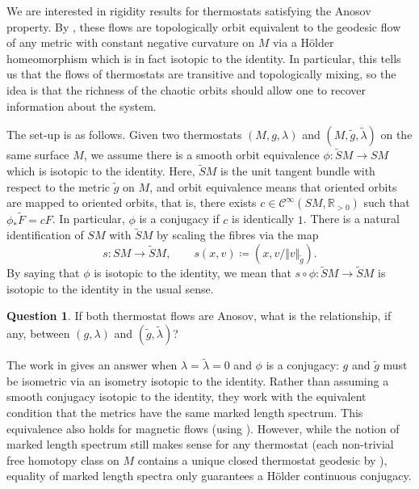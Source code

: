 \documentclass[reqno,12pt,letterpaper]{amsart}
\theoremstyle{definition}
\theoremstyle{remark}
\theoremstyle{definition}
\newtheorem{question}[proposition]{Question}
\numberwithin{equation}{section}
\newcommand{\R}{\mathbb{R}}
\begin{document}
We are interested in rigidity results for thermostats satisfying the Anosov property. By \cite[Theorem A]{ghys84}, these flows are topologically orbit equivalent to the geodesic flow of any metric with constant negative curvature on $M$ via a Hölder homeomorphism which is in fact isotopic to the identity. In particular, this tells us that the flows of thermostats are transitive and topologically mixing, so the idea is that the richness of the chaotic orbits should allow one to recover information about the system. 

The set-up is as follows. Given two thermostats $(M, g, \lambda)$ and $(M, \tilde{g}, \tilde{\lambda})$ on the same surface $M$, we assume there is a smooth orbit equivalence $\phi : \widetilde{S}M\to SM$ which is isotopic to the identity. Here, $\widetilde{S}M$ is the unit tangent bundle with respect to the metric $\tilde{g}$ on $M$, and orbit equivalence means that oriented orbits are mapped to oriented orbits, that is, there exists $c\in \mathcal{C}^\infty(SM, \R_{>0})$ such that $\phi_* \widetilde{F}=cF$. In particular, $\phi$ is a conjugacy if $c$ is identically $1$. There is a natural identification of $SM$ with $\widetilde{S}M$ by scaling the fibres via the map 
\begin{equation}\label{eq:scaling-map}
s: SM\to \widetilde{S}M, \qquad s(x,v)\coloneqq (x, v/\Vert v\Vert_{\tilde{g}}).
\end{equation}
By saying that $\phi$ is isotopic to the identity, we mean that $s\circ \phi :\widetilde{S}M\to \widetilde{S}M$ is isotopic to the identity in the usual sense. 

\begin{question}
If both thermostat flows are Anosov, what is the relationship, if any, between $(g, \lambda)$ and $(\tilde{g}, \tilde{\lambda})$? 
\end{question}

The work in \cite{guillarmou25} gives an answer when $\lambda=\tilde{\lambda}=0$ and $\phi$ is a conjugacy: $g$ and $\tilde{g}$ must be isometric via an isometry isotopic to the identity. Rather than assuming a smooth conjugacy isotopic to the identity, they work with the equivalent condition that the metrics have the same marked length spectrum. This equivalence also holds for magnetic flows (using \cite[Theorem 1.1]{gogolev23}). However, while the notion of marked length spectrum still makes sense for any thermostat (each non-trivial free homotopy class on $M$ contains a unique closed thermostat geodesic by \cite[Theorem A]{ghys84}), equality of marked length spectra only guarantees a Hölder continuous conjugacy.
\end{document}
